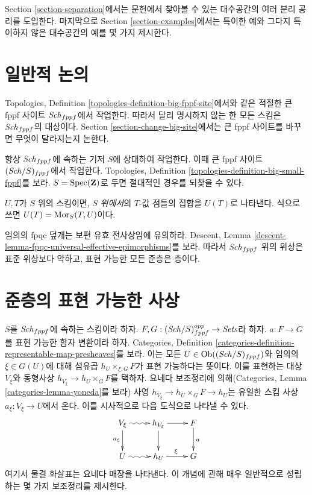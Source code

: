 \medskip\noindent
Section \ref{section-separation}에서는 문헌에서 찾아볼 수 있는
대수공간의 여러 분리 공리를 도입한다. 마지막으로
Section \ref{section-examples}에서는 특이한 예와 그다지 특이하지 않은
대수공간의 예를 몇 가지 제시한다.






\section{일반적 논의}
\label{section-general}

\noindent
Topologies, Definition \ref{topologies-definition-big-fppf-site}에서와 같은
적절한 큰 fppf 사이트 $\mathit{Sch}_{fppf}$에서 작업한다. 따라서 달리 명시하지
않는 한 모든 스킴은 $\mathit{Sch}_{fppf}$의 대상이다.
Section \ref{section-change-big-site}에서는 큰 fppf 사이트를 바꾸면
무엇이 달라지는지 논한다.

\medskip\noindent
항상 $\mathit{Sch}_{fppf}$에 속하는 기저 $S$에 상대하여 작업한다. 이때 큰 fppf
사이트 $(\mathit{Sch}/S)_{fppf}$에서 작업한다. Topologies, Definition
\ref{topologies-definition-big-small-fppf}를 보라. $S = \mathop{\mathrm{Spec}}(\mathbf{Z})$로
두면 절대적인 경우를 되찾을 수 있다.

\medskip\noindent
$U, T$가 $S$ 위의 스킴이면, $S$ {\it 위에서}의 $T$-값 점들의 집합을
$U(T)$로 나타낸다. 식으로 쓰면 $U(T) = \mathop{\mathrm{Mor}}\nolimits_S(T, U)$이다.

\medskip\noindent
임의의 fpqc 덮개는 보편 유효 전사상임에 유의하라. Descent, Lemma
\ref{descent-lemma-fpqc-universal-effective-epimorphisms}를 보라. 따라서
$\mathit{Sch}_{fppf}$ 위의 위상은 표준 위상보다 약하고, 표현 가능한 모든 준층은
층이다.







\section{준층의 표현 가능한 사상}
\label{section-representable}

\noindent
$S$를 $\mathit{Sch}_{fppf}$에 속하는 스킴이라 하자.
$F, G : (\mathit{Sch}/S)_{fppf}^{opp} \to \textit{Sets}$라 하자.
$a : F \to G$를 표현 가능한 함자 변환이라 하자. Categories,
Definition \ref{categories-definition-representable-map-presheaves}를 보라.
이는 모든 $U \in \mathop{\mathrm{Ob}}\nolimits((\mathit{Sch}/S)_{fppf})$와 임의의 $\xi \in G(U)$에 대해
섬유곱 $h_U \times_{\xi, G} F$가 표현 가능하다는 뜻이다.
이를 표현하는 대상 $V_\xi$와 동형사상
$h_{V_\xi} \to h_U \times_G F$를 택하자.
요네다 보조정리에 의해(Categories, Lemma \ref{categories-lemma-yoneda}를
보라) 사영 $h_{V_\xi} \to h_U \times_G F \to h_U$는 유일한 스킴 사상
$a_\xi : V_\xi \to U$에서 온다. 이를 시사적으로 다음 도식으로 나타낼 수
있다.
$$
\xymatrix{
V_\xi \ar@{~>}[r] \ar[d]_{a_\xi} & h_{V_\xi} \ar[d] \ar[r] & F \ar[d]^a \\
U \ar@{~>}[r] & h_U \ar[r]^\xi & G
}
$$
여기서 물결 화살표는 요네다 매장을 나타낸다. 이 개념에 관해 매우
일반적으로 성립하는 몇 가지 보조정리를 제시한다.

